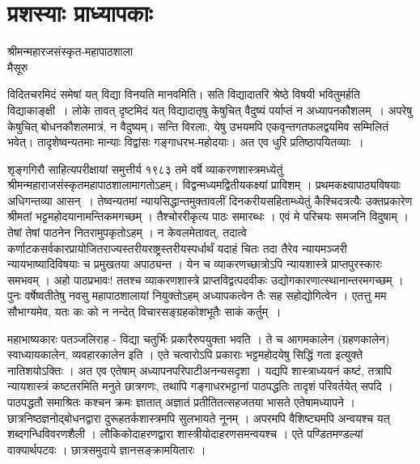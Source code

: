 {\fontsize{16}{18}\selectfont
\presetvalues
\chapter{प्रशस्याः प्राध्यापकाः}

\begin{center}
\smallskip
श्रीमन्महारजसंस्कृत-महापाठशाला\\
मैसूरु
\addrule
\end{center}


विदितचरमिदं समेषां यत् विद्या विनयति मानवमिति। सति विद्यादातरि श्रेष्ठे विषयी भवितुमर्हति विद्याकाङ्क्षी~।  लोके तावत् दृष्टमिदं यत् विद्यादातृषु केषुचित् वैदुष्यं पर्याप्तं न अध्यापनकौशलम्~। अपरेषु केषुचित् बोधनकौशलमात्रं, न वैदुष्यम्। सन्ति विरलाः, येषु उभयमपि एकवृन्तगतफलद्वयमिव सम्मिलितं भवेत्। तादृशेष्वन्यतमाः मान्याः विद्वांसः गङ्गाधरभ-महोदयाः। अत एव धुरि प्रतिष्ठापयितव्याः~।

शृङ्गगिरौ साहित्यपरीक्षायां समुत्तीर्य १९८३ तमे वर्षे व्याकरणशास्त्रमध्येतुं श्रीमन्महाराजसंस्कृत\enginline{-}महापाठशालामागतोऽहम्। विद्वन्मध्यमद्वितीयकक्ष्यां प्राविशम् । प्रथम\-कक्ष्यापाठ्यविषयाः अधिगन्तव्या आसन्~। तेष्वन्यतमां न्यायसिद्धान्तमुक्तावलीं दिनकरीयसहिताम्ध्येतुं कैश्चिदत्रत्यैः उक्तप्रकारेण श्रीमतां भट्टमहोदयानामन्तिकमगच्छम् । तैश्चोररीकृत्य पाठः समारब्धः ।\-  एवं मे परिचयः समजनि विदुषाम् । तेषां तेषां पाठनेन नितरामुपकृतोऽहम् ।\- न केवलमेतावत्, तदात्वे कर्णाटक\enginline{-}सर्वकारप्रायोजित\enginline{-}राज्यस्तरीय\enginline{-}राष्ट्रस्तरीयस्पर्धार्थं यदाहं चितः तदा तैरेव न्यायमञ्जरी न्यायभाष्यादिविषयाः च  प्रमुखतया अपाठ्यन्त । येन च व्याकरणच्छात्रोऽपि न्यायशास्त्रे प्राप्तपुरस्कारः समभवम् । अहो पाठप्रभावः! ततश्च व्याकरणशास्त्रे प्राप्तविद्वत्पदवीकः उद्योगकारणात्\break स्थानान्तरमगच्छम् ।  पुनः वर्षेष्वतीतेषु नवसु महापाठशालायां नियुक्तोऽहम् अध्यापकत्वेन तैः सह सहोद्योगित्वेन । एतत्तु मम सौभाग्यमेव, यतः कः को न नन्देत् विचारसङ्ग्रहकोशभूतैः साकं कर्तुम्~।

महाभाष्यकारः पतञ्जलिराह - विद्या चतुर्भिः प्रकारैरुपयुक्ता भवति । ते च आगमकालेन (ग्रहणकालेन) स्वाध्यायकालेन, व्यवहारकालेन इति । एते चत्वारोऽपि प्रकाराः भट्टमहोदयेषु सिद्धिं गता इत्युक्ते नातिशयोऽक्तिः । अत एव एतेषाम् अध्यापनपरिपाटी\break अनन्यसदृशा । यद्यपि शास्त्राध्ययनं कष्टं, तत्रापि न्यायशास्त्रं कष्टतरमिति मनुते छात्रगणः, तथापि गङ्गाधरभट्टानां पाठपद्धतिः तादृशं परिवर्तयेत् सपदि । पाठपद्धतौ समाश्रितः कश्चन क्रमः ज्ञातात् अज्ञातं प्रतीति\enginline{-}तत्सहजतया भासते एतेषामध्यापने । छात्रनिष्ठज्ञनोद्बोधनद्वारा दुरूहतर्कशास्त्रमपि सुलभायते नूनम् । अपरमपि वैशिष्ट्यमपि अन्वयश्च यत् शब्दगन्धिविवरणशैली । लौकिकोदाहरणद्वारा शास्त्रीयोदाहरणसमन्वयश्च । एते पण्डितमण्डल्यां वाक्यार्थपटवः । छात्रसमुदाये ज्ञानसङ्क्रामयितारः ।

}
